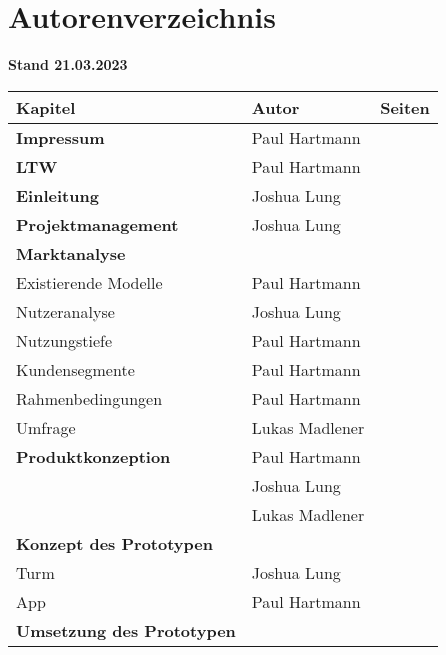 \section{Autorenverzeichnis}

\textbf{Stand 21.03.2023}

\begin{longtable}{llr}
  \textbf{Kapitel}                  & \textbf{Autor} & \textbf{Seiten} \\
  \toprule
  \textbf{Impressum}                & Paul Hartmann  &                 \\
  \midrule
  \textbf{LTW}                      & Paul Hartmann  &                 \\
  \midrule
  \textbf{Einleitung}               & Joshua Lung    &                 \\
  \midrule
  \textbf{Projektmanagement}        & Joshua Lung    &                 \\
  \midrule
  \textbf{Marktanalyse}             &                &                 \\
  Existierende Modelle              & Paul Hartmann  &                 \\
  Nutzeranalyse                     & Joshua Lung    &                 \\
  Nutzungstiefe                     & Paul Hartmann  &                 \\
  Kundensegmente                    & Paul Hartmann  &                 \\
  Rahmenbedingungen                 & Paul Hartmann  &                 \\
  Umfrage                           & Lukas Madlener &                 \\
  \midrule
  \textbf{Produktkonzeption}        & Paul Hartmann  &                 \\
                                    & Joshua Lung    &                 \\
                                    & Lukas Madlener &                 \\
  \midrule
  \textbf{Konzept des Prototypen}   &                &                 \\
  Turm                              & Joshua Lung    &                 \\
  App                               & Paul Hartmann  &                 \\
  \midrule
  \textbf{Umsetzung des Prototypen} &                &                 \\

\end{longtable}
